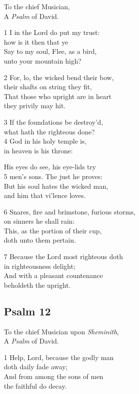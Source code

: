 \begin{multicols}{3}
To the chief Musician,\\
A \emph{Psalm} of David.

1 I in the Lord do put my trust:\\
how is it then that ye\\
Say to my soul, Flee, as a bird,\\
unto your mountain high?

2 For, lo, the wicked bend their bow,\\
their shafts on string they fit,\\
That those who upright are in heart\\
they privily may hit.

3 If the foundations be destroy’d,\\
what hath the righteous done?\\
4 God in his holy temple is,\\
in heaven is his throne:

His eyes do see, his eye-lids try\\
5 men’s sons. The just he proves:\\
But his soul hates the wicked man,\\
and him that vi’lence loves.

6 Snares, fire and brimstone, furious storms,\\
on sinners he shall rain:\\
This, as the portion of their cup,\\
doth unto them pertain.

7 Because the Lord most righteous doth\\
in righteousness delight;\\
And with a pleasant countenance\\
beholdeth the upright.


\subsection*{Psalm 12 }

To the chief Musician upon \emph{Sheminith},\\
A \emph{Psalm} of David.

1 Help, Lord, because the godly man\\
doth daily fade away;\\
And from among the sons of men\\
the faithful do decay.


\end{multicols}
